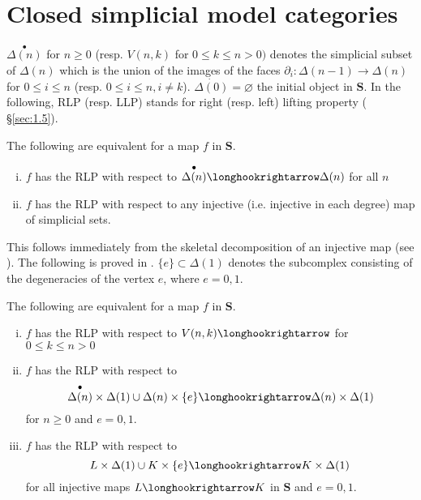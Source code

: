 \documentclass[../main]{subfiles}
\begin{document}
\section{Closed simplicial model categories}\label{sec:2.2}

$\overset{\bullet}{\Delta(n)}$ for $n \geq 0$ (resp. $V(n,k)$ for $0 \leq k \leq n > 0)$ denotes the simplicial subset of $\Delta(n)$ which is the union of the images of the faces $\partial_i \colon \Delta(n-1) \longrightarrow  \Delta(n)$ for $0 \leq i \leq n$ (resp. $0 \leq i \leq n, i \neq k$). $\dot{\Delta(0)} = \varnothing$ the initial object in $\mathbf{S}$. In the following, RLP (resp. LLP) stands for right (resp. left) lifting property ( \S\ref{sec:1.5}).

\begin{proposition} \label{prop:2.2.1} 
    The following are equivalent for a map $f$ in $\mathbf{S}$.
    \begin{enumerate}[(i)]
        \item $f$ has the RLP with respect to $\overset{\bullet}{\Delta(n)} \longhookrightarrow \Delta(n)$ for all $n$
        \item $f$ has the RLP with respect to any injective (i.e. injective in each degree) map of simplicial sets.
    \end{enumerate}
    \end{proposition}
    This follows immediately from the skeletal decomposition of an injective map (see \cite[Ch. II, 3.8]{gabriel_calculus_1967}). The following is proved in \cite[Ch. IV, \S 2.1]{gabriel_calculus_1967}. $\{e\} \subset \Delta(1)$ denotes the subcomplex consisting of the degeneracies of the vertex $e$, where $e=0,1$.


\begin{proposition}\label{prop:2.2.2}
    The following are equivalent for a map $f$ in $\mathbf{S}$.
    \begin{enumerate}[(i)]
        \item $f$ has the RLP with respect to $V(n,k) \longhookrightarrow$ for $0 \leq k \leq n > 0$
        \item $f$ has the RLP with respect to \[\overset{\bullet}{\Delta(n)} \times \Delta(1) \cup \Delta(n) \times \{e\} \longhookrightarrow \Delta(n) \times \Delta(1)\] for $n \geq 0$ and $e=0,1$.
        \item $f$ has the RLP with respect to \[L\times \Delta(1) \cup K\times\{e\} \longhookrightarrow K \times \Delta(1)\] for all injective maps $L \longhookrightarrow K$ in $\mathbf{S}$ and $e=0,1$.
    \end{enumerate}
\end{proposition}
\end{document}
